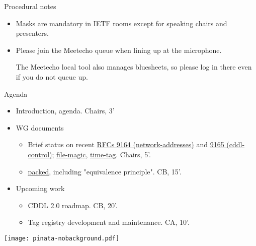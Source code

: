 \documentclass[aspectratio=169]{beamer}
\begin{document}
\begin{frame}{Procedural notes}
    \begin{itemize}
        \item Masks are mandatory in IETF rooms except for speaking chairs and presenters.
        \item Please join the Meetecho queue when lining up at the microphone.

            The Meetecho local tool also manages bluesheets, so please log in there even if you do not queue up.
    \end{itemize}
\end{frame}

\begin{frame}{Agenda}\large
    \begin{itemize}
        \item Introduction, agenda. Chairs, 3'

        \item WG documents
            \begin{itemize}
                \item Brief status on recent \href{https://datatracker.ietf.org/doc/rfc9164/}{RFCs 9164 (network-addresses)} and \href{https://datatracker.ietf.org/doc/rfc9165/}{9165 (cddl-control)}; \href{https://datatracker.ietf.org/doc/draft-ietf-cbor-file-magic/}{file-magic}, \href{https://datatracker.ietf.org/doc/draft-ietf-cbor-time-tag/}{time-tag}. Chairs, 5'.
                \item \href{https://datatracker.ietf.org/doc/draft-ietf-cbor-packed/}{packed}, including "equivalence principle". CB, 15'.
            \end{itemize}

            \item Upcoming work
            \begin{itemize}
                \item CDDL 2.0 roadmap. CB, 20'.
                \item Tag registry development and maintenance. CA, 10'.
            \end{itemize}
    \end{itemize}

    \vspace{-3cm}
    \begin{block}{\texttt{[image: pinata-nobackground.pdf]}\mbox{\quad}}
    \end{block}
\end{frame}
\end{document}
